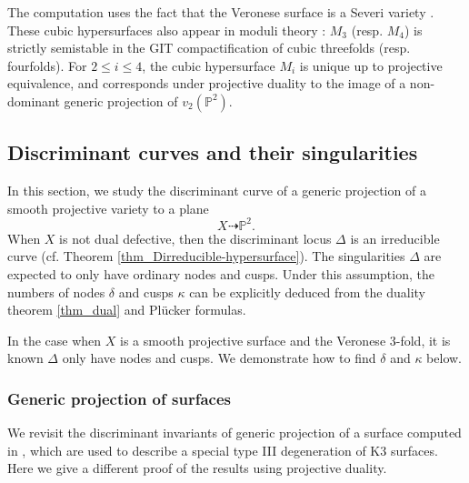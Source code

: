 \documentclass[12pt]{amsart}
\begin{document}
The computation uses the fact that the Veronese surface is a Severi variety \cite[Theorem 2.4]{Zak_tangents&secants}. These cubic hypersurfaces also appear in moduli theory \cite{CMSHL21,Loo09}: $M_3$ (resp. $M_4$) is strictly semistable in the GIT compactification of cubic threefolds (resp. fourfolds). For $2\le i\le 4$, the cubic hypersurface $M_i$ is unique up to projective equivalence, and corresponds under projective duality to the image of a non-dominant generic projection of $v_2(\mathbb P^2)$.



\subsection{Discriminant curves and their singularities}\label{subsec_nodes&cusps}
In this section, we study the discriminant curve of a generic projection of a smooth projective variety to a plane
$$X\dashrightarrow \mathbb P^2.$$
When $X$ is not dual defective, then the discriminant locus $\Delta$ is an irreducible curve (cf. Theorem \ref{thm_Dirreducible-hypersurface}). The singularities $\Delta$ are expected to only have ordinary nodes and cusps. Under this assumption, the numbers of nodes $\delta$ and cusps $\kappa$ can be explicitly deduced from the duality theorem \ref{thm_dual} and Pl\"ucker formulas. 

In the case when $X$ is a smooth projective surface and the Veronese 3-fold, it is known $\Delta$ only have nodes and cusps. We demonstrate how to find $\delta$ and $\kappa$ below. 

\subsubsection{Generic projection of surfaces}
We revisit the discriminant invariants of generic projection of a surface computed in \cite{CMT01}, which are used to describe a special type III degeneration of K3 surfaces. Here we give a different proof of the results using projective duality.
\end{document}
